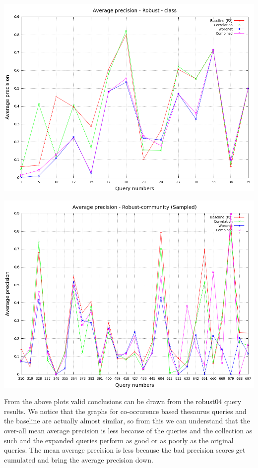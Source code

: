 \documentclass[a4paper, 12pt, notitlepage]{report}
\begin{document}
\begin{center}
\includegraphics[scale = 0.4]{robust-class_avg}
\end{center}

\begin{center}
\includegraphics[scale = 0.4]{sampled-robust-comm_avg}
\end{center}

From the above plots valid conclusions can be drawn from the robust04 query results. We notice that the graphs for co-occurence based thesaurus queries and the baseline are actually almost similar, so from this we can understand that the over-all mean average precision is less because of the queries and the collection as such and the expanded queries perform as good or as poorly as the original queries. The mean average precision is less because the bad precision scores get cumulated and bring the average precision down.
\end{document}
